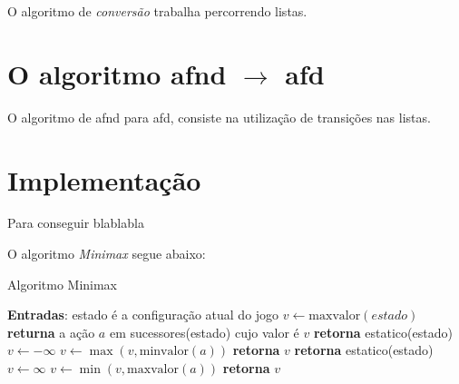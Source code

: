 \documentclass[a4paper,10pt]{article} %
\begin{document}
O algoritmo de \textit{conversão} trabalha percorrendo listas.

\section{O algoritmo afnd $\rightarrow$ afd}

O algoritmo de afnd para afd, consiste na utilização de transições nas listas.

\section{Implementação}

Para conseguir blablabla

O algoritmo \textit{Minimax} segue abaixo:

\begin{algorithm}
\caption{Algoritmo Minimax}\label{alg:minimax}
\begin{algorithmic}[1]
\State \textbf{Entradas}: estado é a configuração atual do jogo
\State $v\gets \mathrm{maxvalor}{(estado)}$
\State \textbf{returna} a ação $a$ em sucessores(estado) cujo valor é $v$ %
\EndFunction
{}
   \State \textbf{retorna} estatico(estado)
\EndIf
\State $v \gets -\infty$
    \State $v \gets \max{(v, \mathrm{minvalor}(a))}$
\EndFor
\State \textbf{retorna} $v$
\EndFunction
{}
   \State \textbf{retorna} estatico(estado)
\EndIf
\State $v \gets \infty$
    \State $v \gets \min{(v, \mathrm{maxvalor}(a))}$
\EndFor
\State \textbf{retorna} $v$
\EndFunction
\end{algorithmic}
\end{algorithm}
\end{document}
